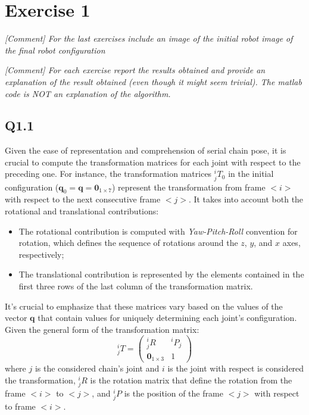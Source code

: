 \section{Exercise 1} \label{P1}
\textit{[Comment] For the last exercises include an image of the initial robot image of the final robot configuration} 

\textit{[Comment] For each exercise report the results obtained and provide an explanation of the result obtained (even though it might seem trivial). The matlab code is NOT an explanation of the algorithm.}
 
\subsection{Q1.1}
\label{subsec::q11}
Given the ease of representation and comprehension of serial chain pose, it is crucial to compute the transformation matrices for each joint with respect to the preceding one. For instance, the transformation matrices $^i_jT_0$ in the initial configuration ($\mathbf{q}_0 = \mathbf{q} = \mathbf{0}_{1 \times 7}$) represent the transformation from frame $<i>$ with respect to the next consecutive frame $<j>$. It takes into account both the rotational and translational contributions:
\begin{itemize}
	\item The rotational contribution is computed with \textit{Yaw-Pitch-Roll} convention for rotation, which defines the sequence of rotations around the $z$, $y$, and $x$ axes, respectively;
	\item The translational contribution is represented by the elements contained in the first three rows of the last column of the transformation matrix.
\end{itemize}
It’s crucial to emphasize that these matrices vary based on the values of the vector $\mathbf{q}$ that contain values for uniquely determining each joint’s configuration.
Given the general form of the transformation matrix:
\begin{equation}
	^i_j T = \begin{pmatrix}
		^i_j R & ^i P_j \\
		\mathbf{0}_{1\times3} & 1
	\end{pmatrix}
\end{equation}
where $j$ is the considered chain's joint and $i$ is the joint with respect is considered the transformation, $^i_j R$ is the rotation matrix that define the rotation from the frame $<i>$ to $<j>$, and $^i_j P$ is the position of the frame $<j>$ with respect to frame $<i>$.
